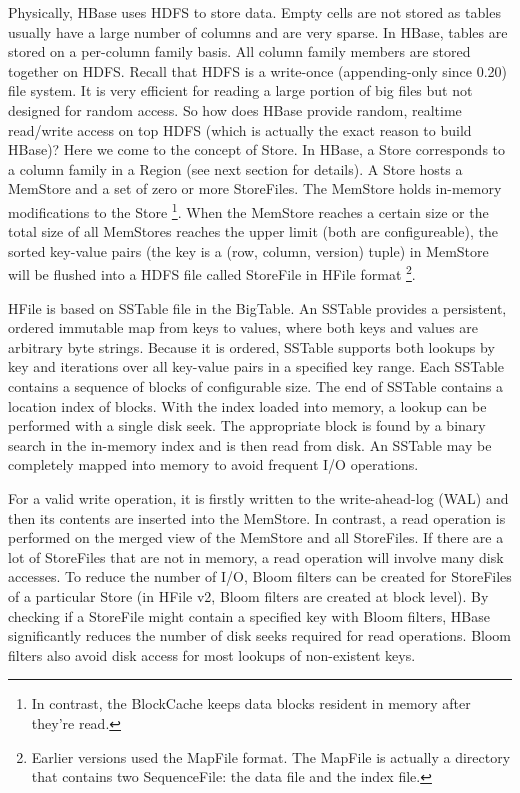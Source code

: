 \documentclass[12pt]{book}
\begin{document}
Physically, HBase uses HDFS to store data. Empty cells are not stored as tables usually have a large number of columns and are very sparse. In HBase, tables are stored on a per-column family basis. All column family members are stored together on HDFS. 
Recall that HDFS is a write-once (appending-only since 0.20) file system. It is very efficient for reading a large portion of  big files but not designed for random access. So how does HBase provide random, realtime read/write access on top HDFS (which is actually the exact reason to build HBase)? Here we come to the concept of Store. In HBase, a Store corresponds to a column family in a Region (see next section for details). A Store hosts a MemStore and a set of zero or more StoreFiles. The MemStore holds in-memory modifications to the Store \footnote{In contrast, the BlockCache keeps data blocks resident in memory after they're read.}. When the MemStore reaches a certain size or the total size of all MemStores reaches the upper limit (both are configureable), the sorted key-value pairs (the key is a (row, column, version) tuple) in MemStore will be flushed into a HDFS file called StoreFile in HFile format \footnote{Earlier versions used the MapFile format. The MapFile is actually a directory that contains two SequenceFile: the data file and the index file. }.

HFile is based on SSTable file in the BigTable. An SSTable provides a persistent, ordered immutable map from keys to values, where both keys and values are arbitrary byte strings. Because it is ordered, SSTable supports both lookups by key and iterations over all key-value pairs in a specified key range. Each SSTable contains a sequence of blocks of configurable size. The end of SSTable contains a location index of blocks. With the index loaded into memory, a lookup can be performed with a single disk seek. The appropriate block is found by a binary search in the in-memory index and is then read from disk. An SSTable may be completely mapped into memory to avoid frequent I/O operations.

For a valid write operation, it is firstly written to the write-ahead-log (WAL) and then its contents are inserted into the MemStore. In contrast, a read operation is performed on the merged view of the MemStore and all StoreFiles. If there are a lot of StoreFiles that are not in memory, a read operation will involve many disk accesses. To reduce the number of I/O, Bloom filters \cite{Bloom:1970:STH} can be created for StoreFiles of a particular Store (in HFile v2, Bloom filters are created at block level). By checking if a StoreFile might contain a specified key with Bloom filters, HBase significantly reduces the number of disk seeks required for read operations. Bloom filters also avoid disk access for most lookups of non-existent keys.
\end{document}
